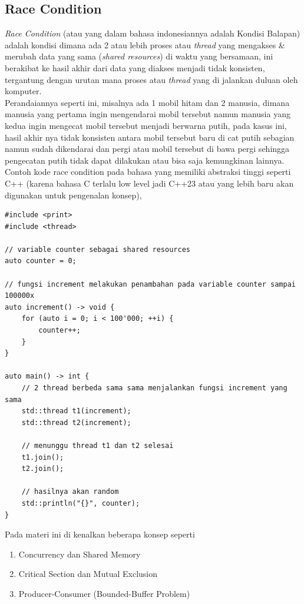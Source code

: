 \subsection{Race Condition}
\textit{Race Condition} (atau yang dalam bahasa indonesiannya adalah Kondisi Balapan) adalah kondisi dimana ada 2 atau lebih proses atau \textit{thread} yang mengakses \& merubah data yang sama (\textit{shared resources}) di waktu yang bersamaan,
ini berakibat ke hasil akhir dari data yang diakses menjadi tidak konsisten, tergantung dengan urutan mana proses atau \textit{thread} yang di jalankan duluan oleh komputer\cite{noauthor_race_nodate}.\\ 
Perandaiannya seperti ini, misalnya ada 1 mobil hitam dan 2 manusia, dimana manusia yang pertama ingin mengendarai mobil tersebut namun manusia yang kedua ingin mengecat mobil tersebut menjadi berwarna putih,
pada kasus ini, hasil akhir nya tidak konsisten antara mobil tersebut baru di cat putih sebagian namun sudah dikendarai dan pergi atau mobil tersebut di bawa pergi sehingga pengecatan putih tidak dapat dilakukan
atau bisa saja kemungkinan lainnya.\\ 
Contoh kode race condition pada bahasa yang memiliki abstraksi tinggi seperti C++ (karena bahasa C terlalu low level jadi C++23 atau yang lebih baru akan digunakan untuk pengenalan konsep),
\begin{verbatim}
#include <print>
#include <thread>

// variable counter sebagai shared resources
auto counter = 0;

// fungsi increment melakukan penambahan pada variable counter sampai 100000x
auto increment() -> void {
    for (auto i = 0; i < 100'000; ++i) {
        counter++;
    }
}

auto main() -> int {
    // 2 thread berbeda sama sama menjalankan fungsi increment yang sama
    std::thread t1(increment);
    std::thread t2(increment);

    // menunggu thread t1 dan t2 selesai
    t1.join();
    t2.join();

    // hasilnya akan random
    std::println("{}", counter);
}
\end{verbatim}
Pada materi ini di kenalkan beberapa konsep seperti \\ 
\begin{enumerate}
  \item Concurrency dan Shared Memory
  \item Critical Section dan Mutual Exclusion
  \item Producer-Consumer (Bounded-Buffer Problem)
\end{enumerate}

